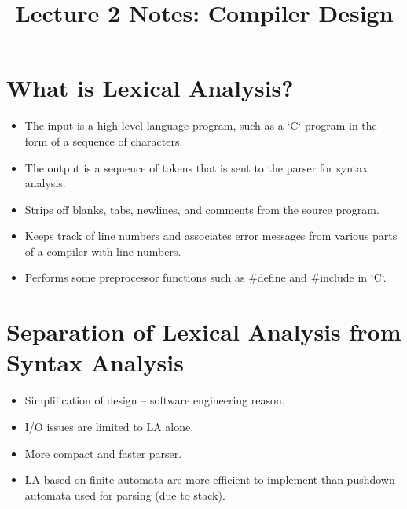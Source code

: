 \documentclass[12pt,a4paper]{article}
\title{\textbf{Lecture 2 Notes: Compiler Design}}
\author{}
\date{}
\begin{document}
\maketitle

\begin{small}
\tableofcontents
\end{small}%
\pagebreak

\section{What is Lexical Analysis?}
\begin{itemize}
    \item The input is a high level language program, such as a `C` program in the form of a sequence of characters.
    \item The output is a sequence of tokens that is sent to the parser for syntax analysis.
    \item Strips off blanks, tabs, newlines, and comments from the source program.
    \item Keeps track of line numbers and associates error messages from various parts of a compiler with line numbers.
    \item Performs some preprocessor functions such as \#define and \#include in `C`.
\end{itemize}

\section{Separation of Lexical Analysis from Syntax Analysis}
\begin{itemize}
    \item Simplification of design -- software engineering reason.
    \item I/O issues are limited to LA alone.
    \item More compact and faster parser.
    \item LA based on finite automata are more efficient to implement than pushdown automata used for parsing (due to stack).
\end{itemize}
\end{document}
